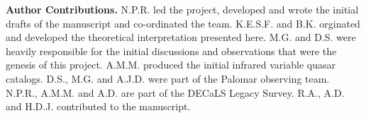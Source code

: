 {\bf Author Contributions.}   
N.P.R. led the project, developed and wrote the initial drafts of the manuscript and co-ordinated the team.
K.E.S.F. and B.K. orginated and developed the theoretical interpretation presented here. 
M.G. and D.S. were heavily responsible for the initial discussions and observations that were the genesis of
this project. A.M.M. produced the initial infrared variable quasar catalogs.  
D.S., M.G. and A.J.D. were part of the Palomar observing team.
N.P.R., A.M.M. and A.D. are part of the DECaLS Legacy Survey. 
R.A., A.D. and H.D.J. contributed to the manuscript.
\smallskip
\smallskip

